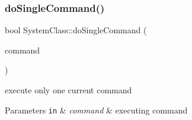 \subsubsection{\texorpdfstring{do\+Single\+Command()}{doSingleCommand()}}
{\footnotesize\ttfamily bool System\+Class\+::do\+Single\+Command (\begin{DoxyParamCaption}\item[{\hyperlink{class_command_class}{Command\+Class} $\ast$}]{command }\end{DoxyParamCaption})\hspace{0.3cm}{\ttfamily [private]}}



execute only one current command 


\begin{DoxyParams}[1]{Parameters}
\mbox{\tt in}  & {\em command} & executing command \\
\hline
\end{DoxyParams}

